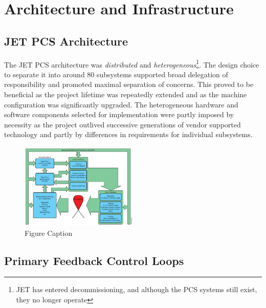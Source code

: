 \documentclass[5p]{elsarticle}
\begin{document}
\section{Architecture and Infrastructure}

\subsection{JET PCS Architecture}

The JET PCS architecture was
{\em distributed} and {\em heterogeneous}\footnote{JET has entered decommissioning, and although the PCS systems still exist, they no longer operate}.  
The design choice to separate it into around 80 subsystems supported broad delegation of responsibility and
promoted maximal separation of concerns. This proved to be beneficial as the project lifetime was repeatedly extended and as the machine configuration was 
significantly upgraded.  The heterogeneous hardware and software components selected for implementation were partly imposed by necessity as the project outlived successive generations of vendor supported  technology and partly by differences in requirements for individual subsystems.

\begin{figure}[ht!]%
\centering%
	\includegraphics[width=0.5\textwidth]{JG_Felton}
\caption{Figure Caption}\label{fig1}
\end{figure}

\subsection{Primary Feedback Control Loops}
\end{document}
